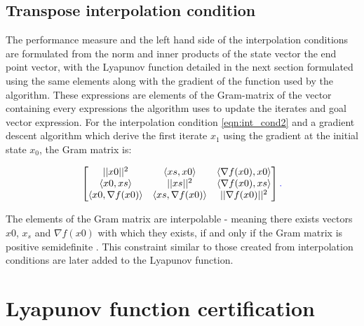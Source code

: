 \subsection*{Transpose interpolation condition}

The performance measure and the left hand side of the interpolation conditions are formulated from the norm and inner products of the state vector the end point vector, with the Lyapunov function detailed in the next section formulated using the same elements along with the gradient of the function used by the algorithm. These expressions are elements of the Gram-matrix of the vector containing every expressions the algorithm uses to update the iterates and goal vector expression. For the interpolation condition \ref{eqn:int_cond2} and a gradient descent algorithm which derive the first iterate $x_1$ using the gradient at the initial state $x_0$, the Gram matrix is:

\begin{equation} \label{eqn:trans_cond}
	\begin{bmatrix}||x0||^2 & \langle xs, x0 \rangle & \langle \nabla f(x0), x0 \rangle \\ \langle x0, xs \rangle & ||xs||^2 & \langle \nabla f(x0), xs \rangle \\ \langle x0, \nabla f(x0) \rangle & \langle xs, \nabla f(x0) \rangle & ||\nabla f(x0)||^2\end{bmatrix}	\textcolor{blue}{.}
\end{equation}

The elements of the Gram matrix are interpolable - meaning there exists vectors $x0$, $x_s$ and $\nabla f(x0)$ with which they exists, if and only if the Gram matrix is positive semidefinite . This constraint  similar to those created from interpolation conditions are later added to the Lyapunov function.

\section{Lyapunov function certification}



